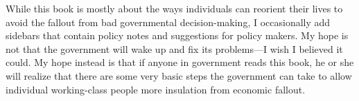 {\color{black}
While this book is mostly about the ways individuals can reorient their
lives to avoid the fallout from bad governmental decision-making, I
occasionally add sidebars that contain policy notes
\textcolor[rgb]{0.32941177,0.5529412,0.83137256}{and} suggestions for
policy makers. My hope is not that the government will wake up and fix
its problems—I wish I believed it could. My hope instead is that if
\textcolor[rgb]{0.32941177,0.5529412,0.83137256}{anyone in government}
reads this book, \textcolor[rgb]{0.32941177,0.5529412,0.83137256}{he or
she} will realize that there are some very basic steps
the\textcolor[rgb]{0.32941177,0.5529412,0.83137256}{ government can
take to} allow individual working-class people
\textcolor[rgb]{0.32941177,0.5529412,0.83137256}{more insulation from
economic fallout}. }
